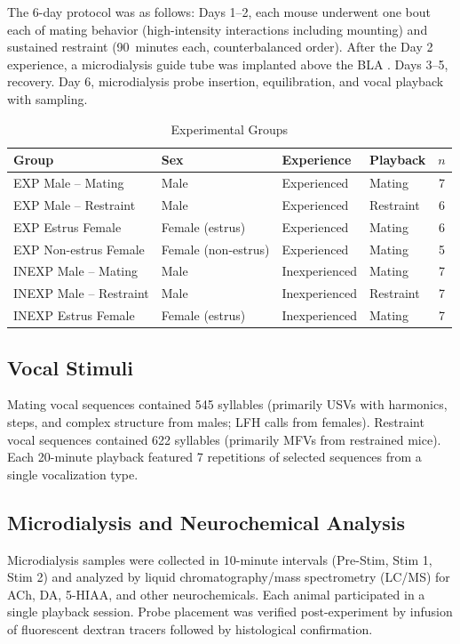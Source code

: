 \documentclass[11pt]{article}
\begin{document}
The 6-day protocol was as follows: Days 1--2, each mouse underwent one bout each of mating behavior (high-intensity interactions including mounting) and sustained restraint (90~minutes each, counterbalanced order). After the Day 2 experience, a microdialysis guide tube was implanted above the BLA \citep{paxinos2001mouse}. Days 3--5, recovery. Day 6, microdialysis probe insertion, equilibration, and vocal playback with sampling.

\begin{table}[ht]
\centering
\caption{Experimental Groups}
\label{tab:groups}
\begin{tabular}{llllc}
\toprule
\textbf{Group} & \textbf{Sex} & \textbf{Experience} & \textbf{Playback} & \textbf{$n$} \\
\midrule
EXP Male -- Mating & Male & Experienced & Mating & 7 \\
EXP Male -- Restraint & Male & Experienced & Restraint & 6 \\
EXP Estrus Female & Female (estrus) & Experienced & Mating & 6 \\
EXP Non-estrus Female & Female (non-estrus) & Experienced & Mating & 5 \\
INEXP Male -- Mating & Male & Inexperienced & Mating & 7 \\
INEXP Male -- Restraint & Male & Inexperienced & Restraint & 7 \\
INEXP Estrus Female & Female (estrus) & Inexperienced & Mating & 7 \\
\bottomrule
\end{tabular}
\end{table}

\subsection{Vocal Stimuli}

Mating vocal sequences contained 545 syllables (primarily USVs with harmonics, steps, and complex structure from males; LFH calls from females). Restraint vocal sequences contained 622 syllables (primarily MFVs from restrained mice). Each 20-minute playback featured 7 repetitions of selected sequences from a single vocalization type.

\subsection{Microdialysis and Neurochemical Analysis}

Microdialysis samples were collected in 10-minute intervals (Pre-Stim, Stim 1, Stim 2) and analyzed by liquid chromatography/mass spectrometry (LC/MS) for ACh, DA, 5-HIAA, and other neurochemicals. Each animal participated in a single playback session. Probe placement was verified post-experiment by infusion of fluorescent dextran tracers followed by histological confirmation.
\end{document}
